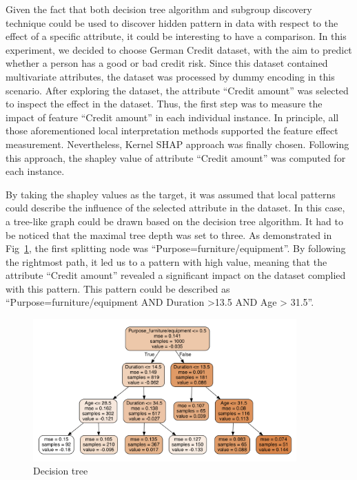 Given the fact that both decision tree algorithm and subgroup discovery technique could be used to discover hidden pattern in data with respect to the effect of a specific attribute, it could be interesting to have a comparison. In this experiment, we decided to choose German Credit dataset, with the aim to predict whether a person has a good or bad credit risk. Since this dataset contained multivariate attributes, the dataset was processed by dummy encoding in this scenario. After exploring the dataset, the attribute “Credit amount” was selected to inspect the effect in the dataset. Thus, the first step was to measure the impact of feature “Credit amount” in each individual instance. In principle, all those aforementioned local interpretation methods supported the feature effect measurement. Nevertheless, Kernel SHAP approach was finally chosen. Following this approach, the shapley value of attribute “Credit amount” was computed for each instance. 

By taking the shapley values as the target, it was assumed that local patterns could describe the influence of the selected attribute in the dataset. In this case, a tree-like graph could be drawn based on the decision tree algorithm. It had to be noticed that the maximal tree depth was set to three. As demonstrated in Fig~\ref{fig:credit_decision_tree}, the first splitting node was “Purpose=furniture/equipment”. By following the rightmost path, it led us to a pattern with high value, meaning that the attribute “Credit amount” revealed a significant impact on the dataset complied with this pattern. This pattern could be described as “Purpose=furniture/equipment AND Duration >13.5 AND Age > 31.5”. 

\begin{figure}[H]
	\includegraphics[width=0.9\textwidth]{imgs/credit_decision_tree.png}
	\caption{Decision tree}
	\label{fig:credit_decision_tree}
\end{figure}

